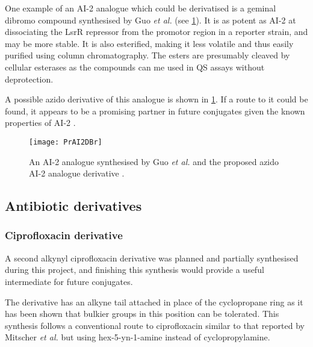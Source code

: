 One example of an AI-2 analogue which could be derivatised is a geminal dibromo compound  synthesised by Guo \textit{et al.}\cite{Guo2015} (see \ref{fgr:PrAI2DBr}). It is as potent as AI-2 at dissociating the LsrR repressor from the promotor region in a reporter strain, and may be more stable. It is also esterified, making it less volatile and thus easily purified using column chromatography. The esters are presumably cleaved by cellular esterases as the compounds can me used in QS assays without deprotection\cite{Guo2012}.

A possible azido derivative  of this analogue is shown in \ref{fgr:PrAI2DBr}. If a route to it could be found, it appears to be a promising partner in future conjugates given the known properties of AI-2 .

\begin{figure}[H]
	\begin{center}
		\texttt{[image: PrAI2DBr]}
		\caption{An AI-2 analogue  synthesised by Guo \textit{et al.} and the proposed azido AI-2 analogue derivative .
		\label{fgr:PrAI2DBr}} 
	\end{center}
\end{figure}





\subsection{Antibiotic derivatives}

\subsubsection{Ciprofloxacin derivative }

A second alkynyl ciprofloxacin derivative  was planned and partially synthesised during this project, and finishing this synthesis would provide a useful intermediate for future conjugates.

The derivative  has an alkyne tail attached in place of the cyclopropane ring as it has been shown that bulkier groups in this position can be tolerated\cite{Mitscher1986,Chu1985}. This synthesis follows a conventional route to ciprofloxacin similar to that reported by Mitscher \textit{et al.}\cite{Mitscher1986} but using hex-5-yn-1-amine  instead of cyclopropylamine.

